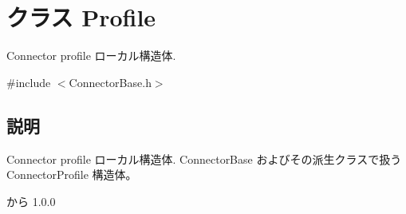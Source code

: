 \section{クラス Profile}
\label{classProfile}


Connector profile ローカル構造体.  




{\ttfamily \#include $<$ConnectorBase.h$>$}



\subsection{説明}
Connector profile ローカル構造体. ConnectorBase およびその派生クラスで扱う ConnectorProfile 構造体。

\begin{DoxySince}{から}
1.0.0 
\end{DoxySince}

